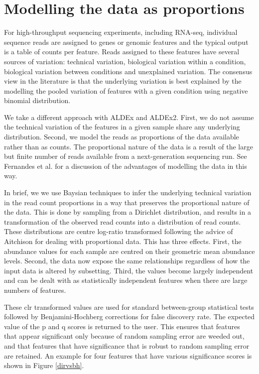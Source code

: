 \documentclass[11pt]{article}
\begin{document}
\section{Modelling the data as proportions}
For high-throughput sequencing experiments, including RNA-seq, individual sequence reads are assigned to genes or genomic features and the typical output is a table of counts per feature. Reads assigned to these features have several sources of variation: technical variation, biological variation within a condition, biological variation between conditions and unexplained variation. The consensus view in the literature is that the underlying variation is best explained by the modelling the pooled variation of  features with a given condition using negative binomial distribution\cite{Anders:2013aa}. 

We take a different approach with ALDEx and ALDEx2. First, we do not assume the technical variation of the features in a given sample share any underlying distribution. Second, we model the reads as proportions  of the data available rather than as counts. The proportional nature of the data is a result of the large but finite number of reads available from a next-generation sequencing run. See Fernandes et al.\cite{fernandes:2013} for a discussion of the advantages of modelling the data in this way. 

In brief, we we use Baysian techniques to infer the underlying technical variation in the read count proportions in a way that preserves the proportional nature of the data. This is done by sampling from a Dirichlet distribution, and results in a transformation of the observed read counts into a distribution of read counts. These distributions are centre log-ratio transformed following the advice of Aitchison\cite{Aitchison:1986} for dealing with proportional data. This has three effects. First, the abundance values for each sample are centred on their geometric mean abundance levels. Second, the data now expose the same relationships regardless of how the input data is altered by subsetting. Third, the values become largely independent and can be dealt with as statistically independent features when there are large numbers of features. 

These clr transformed values are used for standard between-group statistical tests  followed by Benjamini-Hochberg corrections for false discovery rate. The expected value of the p and q scores is returned to the user. This ensures that features that appear significant only because of random sampling error are weeded out, and that features that have significance that is robust to random sampling error are retained. An example for four features that have various significance scores is shown in Figure \ref{dirvsbh}. 
\end{document}
